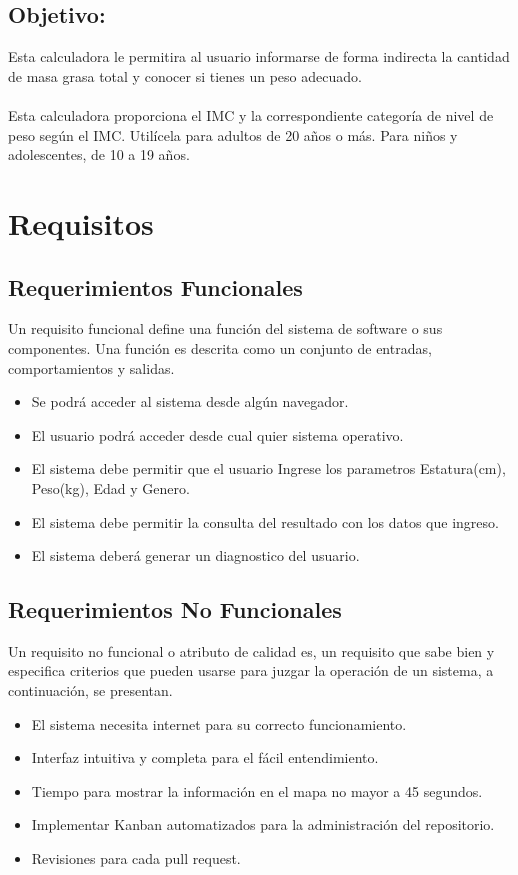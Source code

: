 \documentclass[80pt]{article}
\begin{document}
\subsection{Objetivo:}
\vspace{0.5 cm}
Esta calculadora le permitira al usuario informarse de forma indirecta la cantidad de masa grasa total y conocer si tienes un peso adecuado.\\\\
Esta calculadora proporciona el IMC y la correspondiente categoría de nivel de peso según el IMC. Utilícela para adultos de 20 años o más. Para niños y adolescentes, de 10 a 19 años.
\newpage

\section{Requisitos}
\subsection{Requerimientos Funcionales}
\vspace{0.5 cm}
Un requisito funcional define una función del sistema de software o sus componentes. Una función es descrita como un conjunto de entradas, comportamientos y salidas.
\begin{itemize}
    \item Se podrá acceder al sistema desde algún navegador.
    \item El usuario podrá acceder desde cual quier sistema operativo. 
    \item El sistema debe permitir que el usuario Ingrese los parametros Estatura(cm), Peso(kg), Edad y Genero.
    \item El sistema debe permitir la consulta del resultado con los datos que ingreso.
    \item El sistema deberá generar un diagnostico del usuario.
\end{itemize}

\subsection{Requerimientos No Funcionales}
\vspace{0.5 cm}
Un requisito no funcional o atributo de calidad es, un requisito que sabe bien y especifica criterios que pueden usarse para juzgar la operación de un sistema, a continuación, se presentan. 
\begin{itemize}
    \item El sistema necesita internet para su correcto funcionamiento.
    \item Interfaz intuitiva y completa para el fácil entendimiento. 
    \item Tiempo para mostrar la información en el mapa no mayor a 45 segundos.
    \item Implementar Kanban automatizados para la administración del repositorio.
    \item Revisiones para cada pull request.
\end{itemize}
\newpage
\end{document}
